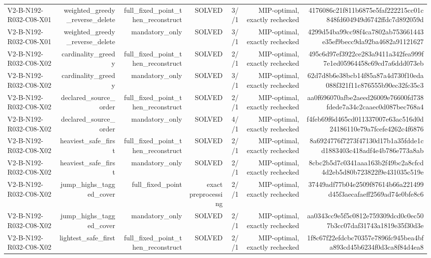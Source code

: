 {\begin{longtable}{lrrrrrr}
V2-B-N192-R032-C08-X01 & weighted\_greedy\_reverse\_delete & full\_fixed\_point\_then\_reconstruct & SOLVED & 3//1 & MIP-optimal, exactly rechecked & 4176086c21f811b6875e5faf222215cc01c848fd604949d6742ffdc7d892059d \\
V2-B-N192-R032-C08-X01 & weighted\_greedy\_reverse\_delete & mandatory\_only & SOLVED & 3//1 & MIP-optimal, exactly rechecked & 4299d54ba99cc98f4ca7802ab753661443e35ef9becc9da92ba4682a91121627 \\
V2-B-N192-R032-C08-X02 & cardinality\_greedy & full\_fixed\_point\_then\_reconstruct & SOLVED & 2//1 & MIP-optimal, exactly rechecked & 495c6d97ef3922ce283a9411a342fea999f7e1ed05964458c69cd7a6ddd073eb \\
V2-B-N192-R032-C08-X02 & cardinality\_greedy & mandatory\_only & SOLVED & 3//1 & MIP-optimal, exactly rechecked & 62d7d8b6e38bcb14f85a87a4d730f10eda088f321f11c876555b90ec32fc35c3 \\
V2-B-N192-R032-C08-X02 & declared\_source\_order & full\_fixed\_point\_then\_reconstruct & SOLVED & 2//1 & MIP-optimal, exactly rechecked & aa0f696070afbe2aeed26009e76600fd738fdede7a34c2caaec0d087bec768a4 \\
V2-B-N192-R032-C08-X02 & declared\_source\_order & mandatory\_only & SOLVED & 4//1 & MIP-optimal, exactly rechecked & f4feb69f6d465cd011337007e63ac516d0d24186110e79a7fcefe4262c4f6876 \\
V2-B-N192-R032-C08-X02 & heaviest\_safe\_first & full\_fixed\_point\_then\_reconstruct & SOLVED & 2//1 & MIP-optimal, exactly rechecked & 8a6924776f7273f47130d17b1a35fdde1cd1883403c418adf4e4b786e773a8ab \\
V2-B-N192-R032-C08-X02 & heaviest\_safe\_first & mandatory\_only & SOLVED & 2//1 & MIP-optimal, exactly rechecked & 8cbc2b5d7c0341aaa163b2f49bc2a8cfcd4d2eb5d80b723822f9e431035c519e \\
V2-B-N192-R032-C08-X02 & jump\_highs\_tagged\_cover & full\_fixed\_point & exact preprocessing & 2//1 & MIP-optimal, exactly rechecked & 37449adf77b04e2509f87614b66a221499d45f3aecafaeff2569ad74e0bfe8c6 \\
V2-B-N192-R032-C08-X02 & jump\_highs\_tagged\_cover & mandatory\_only & SOLVED & 2//1 & MIP-optimal, exactly rechecked & aa0343cc9e5f5c0812e759309dcd0c0ec507b3cc07daf31743a1819e35f30d3e \\
V2-B-N192-R032-C08-X02 & lightest\_safe\_first & full\_fixed\_point\_then\_reconstruct & SOLVED & 2//1 & MIP-optimal, exactly rechecked & 1f8c67f22efdcbc70357e7896fc945bea4bfa893cd45b6234f0d3ca8f84d4ea8 \\

\end{longtable}}
